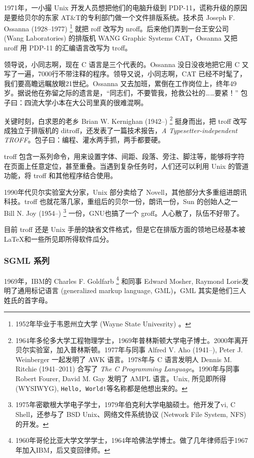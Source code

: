 1971年，一小撮 Unix 开发人员想把他们的电脑升级到 PDP-11，谎称升级的原因是要给贝尔的东家 AT\&T\indexATT 的专利部门做一个文件排版系统。技术员 Joseph F. Ossanna (1928--1977)\indexOssanna{} \footnote{1952年毕业于韦恩州立大学 (Wayne State Univesrity) 。} 就把 roff 改写为 nroff。后来他们弄到一台王安公司 (Wang Laboratories)\indexWangLabs{} 的排版机 WANG Graphic Systems CAT，Ossanna 又把 nroff 用 PDP-11 的汇编语言改写为 troff。

领导说，小同志啊，现在 C 语言是三个代表的。Ossanna 没日没夜地把它用 C 又写了一遍，7000行不带注释的程序。领导又说，小同志啊，CAT 已经不时髦了，我们要高瞻远瞩放眼21世纪。Ossanna 又去加班，累倒在工作岗位上，终年49岁。据说他在弥留之际的遗言是，“同志们，不要管我，抢救公社的……要紧！” 包子曰：四流大学小本在大公司里真的很难混啊。

关键时刻，白求恩的老乡 Brian W. Kernighan (1942--)\indexKernighan{} \footnote{1964年多伦多大学工程物理学士，1969年普林斯顿大学电子博士。2000年离开贝尔实验室，加入普林斯顿。1977年与同事 Alfred V. Aho (1941--), Peter J. Weinberger 一起发明了 AWK 语言。1978年与 C 语言发明人 Dennis M. Ritchie (1941--2011) 合写了 \emph{The C Programming Language}。1990年与同事 Robert Fourer, David M. Gay 发明了 AMPL 语言。Unix, 所见即所得 (WYSIWYG), \texttt{Hello, World!}等名称都是他想出来的。} 挺身而出，把 troff 改写成独立于排版机的 ditroff，还发表了一篇技术报告，\emph{A Typesetter-independent TROFF}。包子曰：编程、灌水两手抓，两手都要硬。

troff 包含一系列命令，用来设置字体、间距、段落、旁注、脚注等，能够将字符在页面上任意定位，甚至重叠。当遇到复杂任务时，人们还可以利用 Unix 的管道功能，将 troff 和其他程序结合使用。

1990年代贝尔实验室大分家，Unix 部分卖给了 Novell，其他部分大多重组进朗讯科技\indexLucent{}。troff 也就花落几家，重组后的贝尔一份，朗讯一份，Sun 的创始人之一 Bill N. Joy (1954--)\indexJoy{} \footnote{1975年密歇根大学电子学士，1979年伯克利大学电脑硕士。他开发了vi, C Shell，还参与了 BSD Unix、网络文件系统协议 (Network File System, NFS) 的开发。} 一份，GNU\indexGNU 也搞了一个 groff。人心散了，队伍不好带了。

目前 troff 还是 Unix 手册的缺省文件格式，但是它在排版方面的领地已经基本被 \LaTeX 和一些所见即所得软件瓜分。

\subsubsection{SGML 系列}

1969年，IBM\indexIBM 的 Charles F. Goldfarb\indexGoldfarb{} \footnote{1960年哥伦比亚大学文学学士，1964年哈佛法学博士。做了几年律师后于1967年加入IBM，后又变回律师。} 和同事 Edward Mosher\indexMosher , Raymond Lorie\indexLorie 发明了通用标记语言 (generalized markup language, GML)，GML 其实是他们三人姓氏的首字母。

